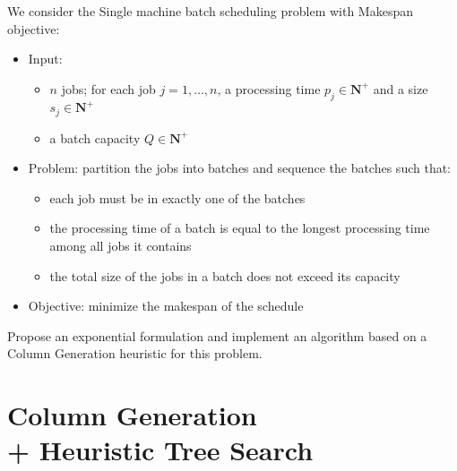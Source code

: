 \documentclass[a4paper,twocolumn]{article}
\newcommand{\N}{\mathbf{N}}
\begin{document}
We consider the Single machine batch scheduling problem with Makespan objective:
\begin{itemize}
  \item Input:
    \begin{itemize}
      \item $n$ jobs; for each job $j = 1, \dots, n$, a processing time $p_j \in \N^+$ and a size $s_j \in \N^+$
      \item a batch capacity $Q \in \N^+$
    \end{itemize}
  \item Problem: partition the jobs into batches and sequence the batches such that:
    \begin{itemize}
      \item each job must be in exactly one of the batches
      \item the processing time of a batch is equal to the longest processing time among all jobs it contains
      \item the total size of the jobs in a batch does not exceed its capacity
    \end{itemize}
  \item Objective: minimize the makespan of the schedule
\end{itemize}

Propose an exponential formulation and implement an algorithm based on a Column Generation heuristic for this problem.

\section{Column Generation \\ + Heuristic Tree Search}
\end{document}
